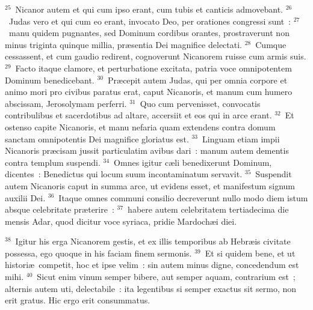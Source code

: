 ${}^{25}$~Nicanor autem et qui cum ipso erant, cum tubis et canticis admovebant.
${}^{26}$~Judas vero et qui cum eo erant, invocato Deo, per orationes congressi sunt~:
${}^{27}$~manu quidem pugnantes, sed Dominum cordibus orantes, prostraverunt non minus triginta quinque millia, pr\ae sentia Dei magnifice delectati.
${}^{28}$~Cumque cessassent, et cum gaudio redirent, cognoverunt Nicanorem ruisse cum armis suis.
${}^{29}$~Facto itaque clamore, et perturbatione excitata, patria voce omnipotentem Dominum benedicebant.
${}^{30}$~Pr\ae cepit autem Judas, qui per omnia corpore et animo mori pro civibus paratus erat, caput Nicanoris, et manum cum humero abscissam, Jerosolymam perferri.
${}^{31}$~Quo cum pervenisset, convocatis contribulibus et sacerdotibus ad altare, accersiit et eos qui in arce erant.
${}^{32}$~Et ostenso capite Nicanoris, et manu nefaria quam extendens contra domum sanctam omnipotentis Dei magnifice gloriatus est.
${}^{33}$~Linguam etiam impii Nicanoris pr\ae cisam jussit particulatim avibus dari~: manum autem dementis contra templum suspendi.
${}^{34}$~Omnes igitur c\ae li benedixerunt Dominum, dicentes~: Benedictus qui locum suum incontaminatum servavit.
${}^{35}$~Suspendit autem Nicanoris caput in summa arce, ut evidens esset, et manifestum signum auxilii Dei.
${}^{36}$~Itaque omnes communi consilio decreverunt nullo modo diem istum absque celebritate pr\ae terire~:
${}^{37}$~habere autem celebritatem tertiadecima die mensis Adar, quod dicitur voce syriaca, pridie Mardoch\ae i diei.


${}^{38}$~Igitur his erga Nicanorem gestis, et ex illis temporibus ab Hebr\ae is civitate possessa, ego quoque in his faciam finem sermonis.
${}^{39}$~Et si quidem bene, et ut histori\ae\ competit, hoc et ipse velim~: sin autem minus digne, concedendum est mihi.
${}^{40}$~Sicut enim vinum semper bibere, aut semper aquam, contrarium est~; alternis autem uti, delectabile~: ita legentibus si semper exactus sit sermo, non erit gratus. Hic ergo erit consummatus.
